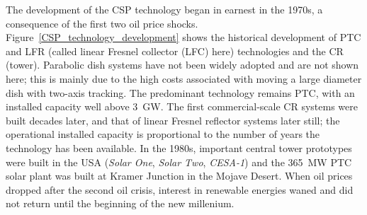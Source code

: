 The development of the CSP technology began in earnest in the 1970s, a consequence of the first two oil price shocks. Figure~\ref{CSP_technology_development} shows the historical development of PTC and LFR (called linear Fresnel collector (LFC) here) technologies and the CR (tower). Parabolic dish systems have not been widely adopted and are not shown here; this is mainly due to the high costs associated with moving a large diameter dish with two-axis tracking. The predominant technology remains PTC, with an installed capacity well above \SI{3}{GW}. The first commercial-scale CR systems were built decades later, and that of linear Fresnel reflector systems later still; the operational installed capacity is proportional to the number of years the technology has been available. In the 1980s, important central tower prototypes were built in the USA (\emph{Solar One}, \emph{Solar Two}, \emph{CESA-1}) and the \SI{365}{\mega\watt} PTC solar plant was built at Kramer Junction in the Mojave Desert. When oil prices dropped after the second oil crisis, interest in renewable energies waned and did not return until the beginning of the new millenium. 


